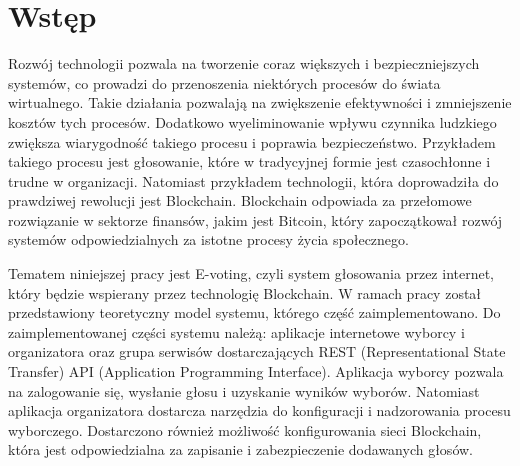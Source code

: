 \documentclass[a4paper,12pt]{book}
\newcounter{stronyPozaNumeracja}
\begin{document}
\vfill

\cleardoublepage

\pagestyle{tylkoNumeryStron}
\tableofcontents

\mainmatter
{}
\setcounter{stronyPozaNumeracja}{\value{page}}
\pagestyle{NumeryStronNazwyRozdzialow}


\chapter{Wstęp}

Rozwój technologii pozwala na tworzenie coraz większych i bezpieczniejszych systemów, co prowadzi do przenoszenia niektórych procesów do świata wirtualnego. Takie działania pozwalają na zwiększenie efektywności i zmniejszenie kosztów tych procesów. Dodatkowo wyeliminowanie wpływu czynnika ludzkiego zwiększa wiarygodność takiego procesu i poprawia bezpieczeństwo. Przykładem takiego procesu jest głosowanie, które w tradycyjnej formie jest czasochłonne i trudne w organizacji. Natomiast przykładem technologii, która doprowadziła do prawdziwej rewolucji jest Blockchain. Blockchain odpowiada za przełomowe rozwiązanie w sektorze finansów, jakim jest Bitcoin, który zapoczątkował rozwój systemów odpowiedzialnych za istotne procesy życia społecznego.

Tematem niniejszej pracy jest E-voting, czyli system głosowania przez internet, który będzie wspierany przez technologię Blockchain. W ramach pracy został przedstawiony teoretyczny model systemu, którego część zaimplementowano. Do zaimplementowanej części systemu należą: aplikacje internetowe wyborcy i organizatora oraz grupa serwisów dostarczających REST (Representational State Transfer) API (Application Programming Interface). Aplikacja wyborcy pozwala na zalogowanie się, wysłanie głosu i uzyskanie wyników wyborów. Natomiast aplikacja organizatora dostarcza narzędzia do konfiguracji i nadzorowania procesu wyborczego. Dostarczono również możliwość konfigurowania sieci Blockchain, która jest odpowiedzialna za zapisanie i zabezpieczenie dodawanych głosów.
\end{document}
